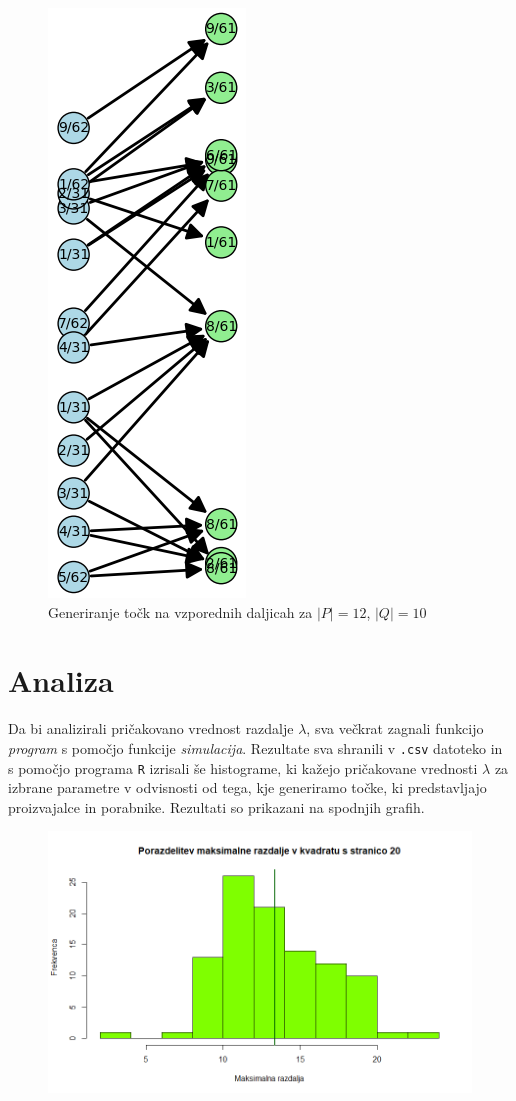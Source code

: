 \documentclass[a4paper, 11pt]{article}
\begin{document}
\begin{figure}[h!]
    \centering
    \includegraphics[scale=0.56]{stran2.png}
    \caption{Generiranje točk na vzporednih daljicah za $|P|=12$, $|Q|=10$}
\end{figure}

\pagebreak
\section{Analiza}
Da bi analizirali pričakovano vrednost razdalje $\lambda$, sva večkrat 
zagnali funkcijo \emph{program} s pomočjo funkcije \emph{simulacija}. Rezultate sva shranili
v \texttt{.csv} datoteko in s pomočjo programa \texttt{R} izrisali še histograme, ki kažejo
pričakovane vrednosti $\lambda$ za izbrane parametre v odvisnosti od tega, kje generiramo točke,
ki predstavljajo proizvajalce in porabnike. Rezultati so prikazani na spodnjih grafih.

\begin{figure}[h!]
    \centering
    \includegraphics[scale=0.5]{porazdelitev_v_kvadratu.png}
\end{figure}
\end{document}
